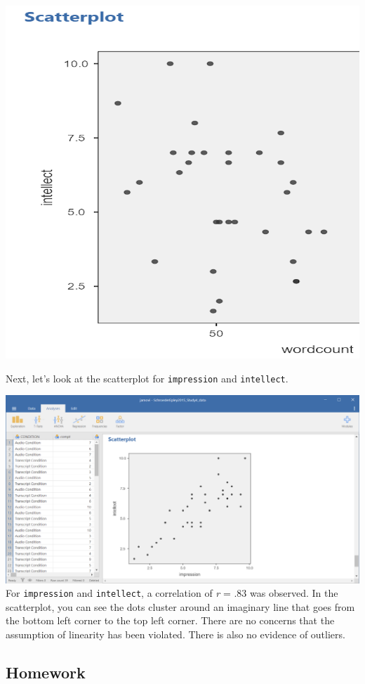 \documentclass[
]{book}
\begin{document}
\includegraphics{img/7.4.71 zoomed in.png}

Next, let's look at the scatterplot for \texttt{impression} and \texttt{intellect}.

\includegraphics{img/7.4.72.png}
For \texttt{impression} and \texttt{intellect}, a correlation of \emph{r} = .83 was observed. In the scatterplot, you can see the dots cluster around an imaginary line that goes from the bottom left corner to the top left corner. There are no concerns that the assumption of linearity has been violated. There is also no evidence of outliers.

\hypertarget{homework-5}{%
\subsection{Homework}\label{homework-5}}
\end{document}
